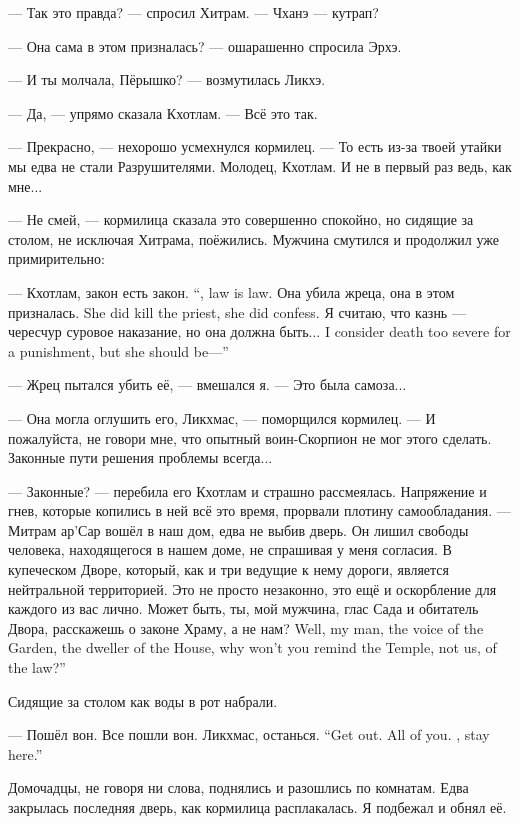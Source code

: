 --- Так это правда? --- спросил Хитрам.
--- Чханэ --- кутрап?

--- Она сама в этом призналась? --- ошарашенно спросила Эрхэ.

--- И ты молчала, Пёрышко? --- возмутилась Ликхэ.

--- Да, --- упрямо сказала Кхотлам.
--- Всё это так.

--- Прекрасно, --- нехорошо усмехнулся кормилец.
--- То есть из-за твоей утайки мы едва не стали Разрушителями.
Молодец, Кхотлам.
И не в первый раз ведь, как мне...

--- Не смей, --- кормилица сказала это совершенно спокойно, но сидящие за столом, не исключая Хитрама, поёжились.
Мужчина смутился и продолжил уже примирительно:

{--- Кхотлам, закон есть закон.}
{``\Kchotlam, law is law.}
{Она убила жреца, она в этом призналась.}
{She did kill the priest, she did confess.}
{Я считаю, что казнь --- чересчур суровое наказание, но она должна быть...}
{I consider death too severe for a punishment, but she should be---''}

--- Жрец пытался убить её, --- вмешался я.
--- Это была самоза...

--- Она могла оглушить его, Ликхмас, --- поморщился кормилец.
--- И пожалуйста, не говори мне, что опытный воин-Скорпион не мог этого сделать.
Законные пути решения проблемы всегда...

--- Законные? --- перебила его Кхотлам и страшно рассмеялась.
Напряжение и гнев, которые копились в ней всё это время, прорвали плотину самообладания.
--- Митрам ар’Сар вошёл в наш дом, едва не выбив дверь.
Он лишил свободы человека, находящегося в нашем доме, не спрашивая у меня согласия.
В купеческом Дворе, который, как и три ведущие к нему дороги, является нейтральной территорией.
Это не просто незаконно, это ещё и оскорбление для каждого из вас лично.
{Может быть, ты, мой мужчина, глас Сада и обитатель Двора, расскажешь о законе Храму, а не нам?}
{Well, my man, the voice of the Garden, the dweller of the House, why won't you remind the Temple, not us, of the law?''}

Сидящие за столом как воды в рот набрали.

{--- Пошёл вон. Все пошли вон. Ликхмас, останься.}
{``Get out. All of you. \Likchmas, stay here.''}

Домочадцы, не говоря ни слова, поднялись и разошлись по комнатам.
Едва закрылась последняя дверь, как кормилица расплакалась.
Я подбежал и обнял её.

